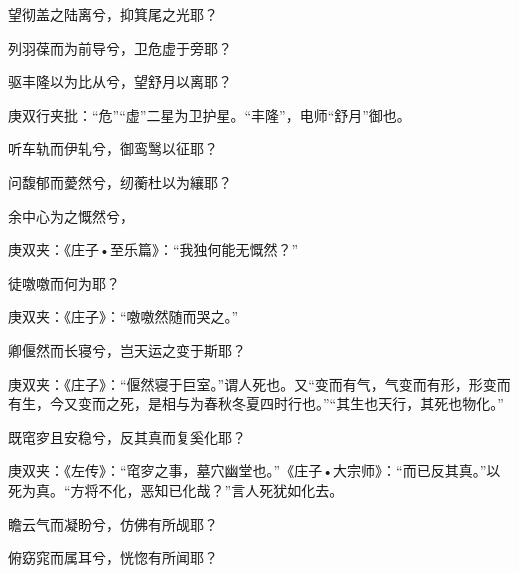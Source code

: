 \begin{qute2sp}
\begin{poem}
        \begin{pl}望彻盖之陆离兮，抑箕尾之光耶？\end{pl}

        \begin{pl}列羽葆而为前导兮，卫危虚于旁耶？\end{pl}

        \begin{pl}驱丰隆以为比从兮，望舒月以离耶？\end{pl}
        \begin{note}庚双行夹批：“危”“虚”二星为卫护星。“丰隆”，电师“舒月”御也。\end{note}

        \begin{pl}听车轨而伊轧兮，御鸾鹥以征耶？\end{pl}

        \begin{pl}问馥郁而薆然兮，纫蘅杜以为纕耶？\end{pl}

        \begin{pl}余中心为之慨然兮，\end{pl}
        \begin{note}庚双夹：《庄子•至乐篇》：“我独何能无慨然？”\end{note}徒噭噭而何为耶？
        \begin{note}庚双夹：《庄子》：“噭噭然随而哭之。”\end{note}

        \begin{pl}卿偃然而长寝兮，岂天运之变于斯耶？\end{pl}
        \begin{note}庚双夹：《庄子》：“偃然寝于巨室。”谓人死也。又“变而有气，气变而有形，形变而有生，今又变而之死，是相与为春秋冬夏四时行也。”“其生也天行，其死也物化。”\end{note}

        \begin{pl}既窀穸且安稳兮，反其真而复奚化耶？\end{pl}
        \begin{note}庚双夹：《左传》：“窀穸之事，墓穴幽堂也。”《庄子•大宗师》：“而已反其真。”以死为真。“方将不化，恶知已化哉？”言人死犹如化去。\end{note}

        \begin{pl}瞻云气而凝盼兮，仿佛有所觇耶？\end{pl}

        \begin{pl}俯窈窕而属耳兮，恍惚有所闻耶？\end{pl}


\end{poem}
\end{qute2sp}

